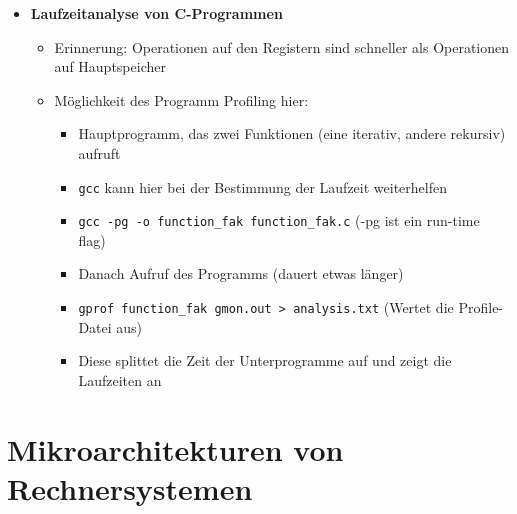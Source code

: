\begin{itemize}
        \item \textbf{Laufzeitanalyse von C-Programmen}
            \begin{itemize}
                \item Erinnerung: Operationen auf den Registern sind schneller als Operationen auf Hauptspeicher
                \item Möglichkeit des Programm Profiling hier:
                    \begin{itemize}
                        \item Hauptprogramm, das zwei Funktionen (eine iterativ, andere rekursiv) aufruft
                        \item \texttt{gcc} kann hier bei der Bestimmung der Laufzeit weiterhelfen
                        \item \texttt{gcc -pg -o function\_fak function\_fak.c} (-pg ist ein run-time flag)
                        \item Danach Aufruf des Programms (dauert etwas länger)
                        \item \texttt{gprof function\_fak gmon.out > analysis.txt} (Wertet die Profile-Datei aus)
                        \item Diese splittet die Zeit der Unterprogramme auf und zeigt die Laufzeiten an
                    \end{itemize}
            \end{itemize}
    \end{itemize}

\section{Mikroarchitekturen von Rechnersystemen}
